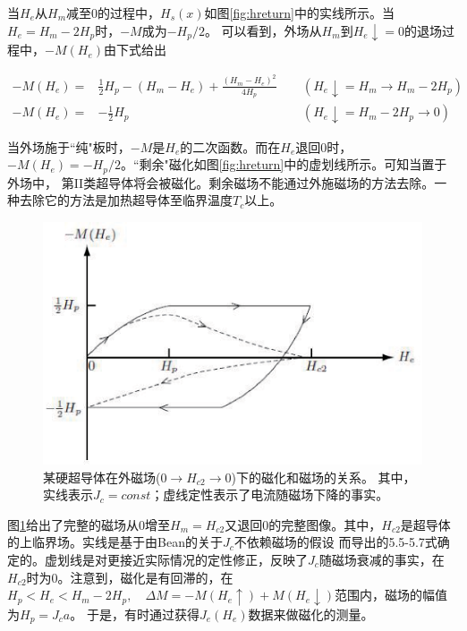 当$H_e$从$H_m$减至0的过程中，$H_s(x)$如图\ref{fig:hreturn}中的实线所示。当$H_e=H_m-2H_p$时，$-M$成为$-H_p /2$。
可以看到，外场从$H_m$到$H_e\downarrow=0$的退场过程中，$-M(H_e)$由下式给出

\begin{subequations}
\begin{align}
  -M(H_e) =&\frac{1}{2}H_p-(H_m-H_e)+\frac{(H_m-H_e)^2}{4H_p}\
\quad& (H_e\downarrow=H_m\rightarrow H_m-2H_p) \\
-M(H_e) =&-\frac{1}{2}H_p\quad &(H_e\downarrow=H_m-2H_p\rightarrow 0)
\end{align}
\end{subequations}


当外场施于``纯"板时，$-M$是$H_e$的二次函数。而在$H_e$退回0时，$-M(H_e)=-H_p /2$。``剩余"磁化如图\ref{fig:hreturn}中的虚划线所示。可知当置于外场中，
第II类超导体将会被磁化。剩余磁场不能通过外施磁场的方法去除。一种去除它的方法是加热超导体至临界温度$T_c$以上。
\begin{figure}[htbp]
  \centering
 \includegraphics[scale=0.8]{chpt5/figs/fig5.3.eps}
  \caption{某硬超导体在外磁场($0\rightarrow H_{c2}\rightarrow 0$)下的磁化和磁场的关系。
  其中，实线表示$J_c=const$；虚线定性表示了电流随磁场下降的事实。}\label{fig:magvsh}
\end{figure}
图\ref{fig:magvsh}给出了完整的磁场从0增至$H_m=H_{c2}$又退回0的完整图像。其中，$H_{c2}$是超导体的上临界场。实线是基于由Bean的关于$J_c$不依赖磁场的假设
而导出的5.5-5.7式确定的。虚划线是对更接近实际情况的定性修正，反映了$J_c$随磁场衰减的事实，在$H_{c2}$时为0。注意到，磁化是有回滞的，在
$H_p<H_e<H_m-2H_p,\quad \Delta M=-M(H_e\uparrow)+M(H_e\downarrow)$范围内，磁场的幅值为$H_p=J_c a$。
于是，有时通过获得$J_e(H_e)$数据来做磁化的测量。
